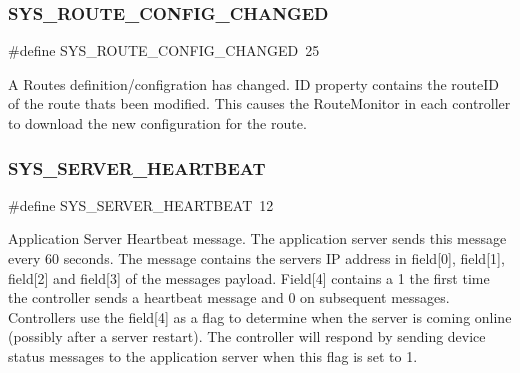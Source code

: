 \subsubsection{\texorpdfstring{S\+Y\+S\+\_\+\+R\+O\+U\+T\+E\+\_\+\+C\+O\+N\+F\+I\+G\+\_\+\+C\+H\+A\+N\+G\+ED}{SYS\_ROUTE\_CONFIG\_CHANGED}}
{\footnotesize\ttfamily \#define S\+Y\+S\+\_\+\+R\+O\+U\+T\+E\+\_\+\+C\+O\+N\+F\+I\+G\+\_\+\+C\+H\+A\+N\+G\+ED~25}

A Route\textquotesingle{}s definition/configration has changed. ID property contains the route\+ID of the route that\textquotesingle{}s been modified. This causes the Route\+Monitor in each controller to download the new configuration for the route. \mbox{\label{group___u_d_p_message_i_d_gaddd0be32c40eb5aa6ff7247ec41d402d}} 
\subsubsection{\texorpdfstring{S\+Y\+S\+\_\+\+S\+E\+R\+V\+E\+R\+\_\+\+H\+E\+A\+R\+T\+B\+E\+AT}{SYS\_SERVER\_HEARTBEAT}}
{\footnotesize\ttfamily \#define S\+Y\+S\+\_\+\+S\+E\+R\+V\+E\+R\+\_\+\+H\+E\+A\+R\+T\+B\+E\+AT~12}

Application Server Heartbeat message. The application server sends this message every 60 seconds. The message contains the server\textquotesingle{}s IP address in field\mbox{[}0\mbox{]}, field\mbox{[}1\mbox{]}, field\mbox{[}2\mbox{]} and field\mbox{[}3\mbox{]} of the message\textquotesingle{}s payload. Field\mbox{[}4\mbox{]} contains a 1 the first time the controller sends a heartbeat message and 0 on subsequent messages. Controllers use the field\mbox{[}4\mbox{]} as a flag to determine when the server is coming online (possibly after a server restart). The controller will respond by sending device status messages to the application server when this flag is set to 1. \mbox{\label{group___u_d_p_message_i_d_ga3021efce231e9a711d6f498630327086}} 
